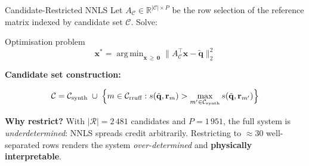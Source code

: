 \documentclass[aspectratio=169,10pt]{beamer}
\DeclareMathOperator*{\argmin}{arg\,min}
\begin{document}
\begin{frame}{Candidate-Restricted NNLS}
  Let $A_{\mathcal{C}}\in\mathbb{R}^{|\mathcal{C}|\times P}$ be the
  row selection of the reference matrix indexed by candidate set
  $\mathcal{C}$.  Solve:
  \begin{block}{Optimisation problem}
    \[
      \mathbf{x}^*
      =\argmin_{\mathbf{x}\,\ge\,\mathbf{0}}
        \bigl\lVert A_{\mathcal{C}}^\top\mathbf{x}
        -\tilde{\mathbf{q}}\bigr\rVert_2^2
    \]
  \end{block}

  \vspace{0.12cm}
  \textbf{Candidate set construction:}
  \begin{tcolorbox}[mathbox]
    \[
      \mathcal{C}=\mathcal{C}_\text{synth}
      \;\cup\;
      \Bigl\{m\in\mathcal{C}_\text{rruff}
        :
        s(\tilde{\mathbf{q}},\mathbf{r}_m)
        >\max_{m'\in\mathcal{C}_\text{synth}}
         s(\tilde{\mathbf{q}},\mathbf{r}_{m'})
      \Bigr\}
    \]
  \end{tcolorbox}

  \vspace{0.12cm}
  \begin{tcolorbox}[whybox]
    \small\textbf{Why restrict?}\enspace
    With $|\mathcal{R}|=2\,481$ candidates and $P=1\,951$,
    the full system is \emph{underdetermined}: NNLS spreads credit
    arbitrarily. Restricting to $\approx30$ well-separated rows
    renders the system \emph{over-determined} and
    \textbf{physically interpretable}.
  \end{tcolorbox}
\end{frame}
\end{document}
